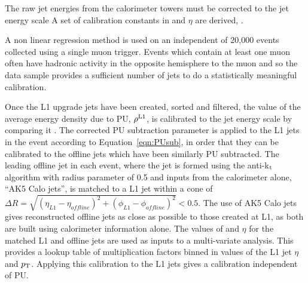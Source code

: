 The raw jet energies from the calorimeter towers must be corrected to the jet energy scale 
A set of calibration constants 
in \pt and $\eta$ are  derived, . %

A non linear regression method is used on an independent  of 
20,000 events collected using a single muon trigger. Events which contain at least one muon often have hadronic activity in the opposite hemisphere to the muon and so the data sample provides a sufficient number of jets to do a statistically meaningful calibration. 

Once the \ac{L1} upgrade jets have been created, sorted and filtered, the value of the average energy density due to \ac{PU}, $\rho^{\rm L1}$, 
is calibrated to the jet energy scale by comparing it .
The corrected \ac{PU} subtraction parameter is applied to the \ac{L1} jets in the event according to Equation~\ref{eqn:PUsub}, in order that they 
can be calibrated to the offline jets which have been similarly \ac{PU} subtracted.
The leading offline jet in each event, where the jet is formed using the anti-k$_{\rm t}$ algorithm with radius parameter of 0.5 and inputs from the calorimeter alone, ``AK5 Calo jets'', is matched to a L1 jet within a cone of 
$\Delta R = \sqrt{ (\eta_{L1} - \eta_{offline})^2 + (\phi_{L1} - \phi_{offline})^2} < 0.5$.
The use of AK5 Calo jets gives reconstructed offline jets as close as possible to those created at \ac{L1}, as both are built using calorimeter information alone.
The values of \pt and $\eta$ for the matched \ac{L1} and offline jets are used as inputs to a multi-variate analysis.  
This provides a lookup table of multiplication factors binned in values of the L1 jet $\eta$ and $p_{\text{T}}$. 
Applying this calibration to the \ac{L1} jets gives a calibration independent of PU. 


